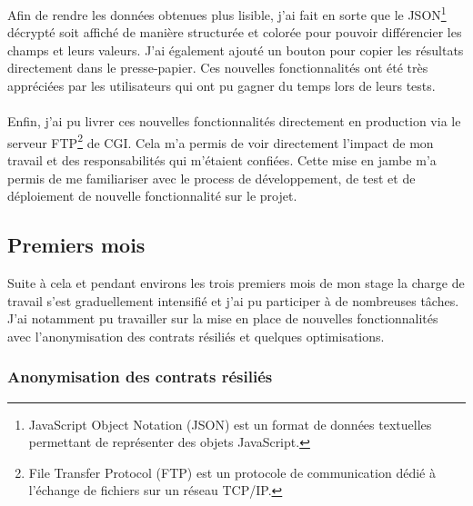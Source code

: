 \documentclass[12pt, a4paper]{report}
\begin{document}
	\noindent
	Afin de rendre les données obtenues plus lisible, j'ai fait en sorte que le JSON\footnote{JavaScript Object Notation (JSON) est un format de données textuelles permettant de représenter des objets JavaScript.} décrypté soit affiché de manière structurée et colorée pour pouvoir différencier les champs et leurs valeurs. J'ai également ajouté un bouton pour copier les résultats directement dans le presse-papier. Ces nouvelles fonctionnalités ont été très appréciées par les utilisateurs qui ont pu gagner du temps lors de leurs tests.
	\\\\
	Enfin, j'ai pu livrer ces nouvelles fonctionnalités directement en production via le serveur FTP\footnote{File Transfer Protocol (FTP) est un protocole de communication dédié à l'échange de fichiers sur un réseau TCP/IP.} de CGI. Cela m'a permis de voir directement l'impact de mon travail et des responsabilités qui m'étaient confiées. Cette mise en jambe m'a permis de me familiariser avec le process de développement, de test et de déploiement de nouvelle fonctionnalité sur le projet.
	
	\newpage
	\subsection{Premiers mois}

	Suite à cela et pendant environs les trois premiers mois de mon stage la charge de travail s'est graduellement intensifié et j'ai pu participer à de nombreuses tâches. J'ai notamment pu travailler sur la mise en place de nouvelles fonctionnalités avec l'anonymisation des contrats résiliés et quelques optimisations.

	\subsubsection{Anonymisation des contrats résiliés}

\end{document}
